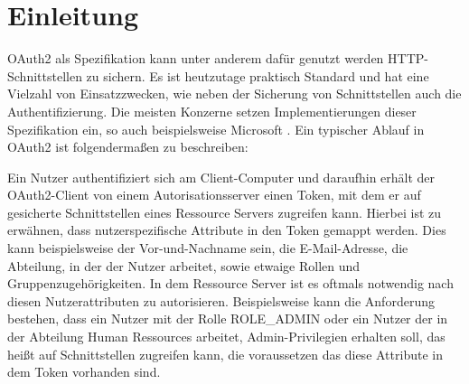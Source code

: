 \chapter{Einleitung}
\label{ch:intro}
OAuth2 als Spezifikation kann unter anderem dafür genutzt werden \ac{HTTP}-Schnittstellen zu sichern. Es ist heutzutage praktisch Standard und hat eine Vielzahl von Einsatzzwecken, wie neben der Sicherung von Schnittstellen auch die Authentifizierung. Die meisten Konzerne setzen Implementierungen dieser Spezifikation ein, so auch beispielsweise Microsoft \citep{microsoftoauth2:2021:07}. Ein typischer Ablauf in OAuth2 ist folgendermaßen zu beschreiben:\smallskip

Ein Nutzer authentifiziert sich am Client-Computer und daraufhin erhält der OAuth2-Client von einem Autorisationsserver einen Token, mit dem er auf gesicherte Schnittstellen eines Ressource Servers zugreifen kann. Hierbei ist zu erwähnen, dass nutzerspezifische Attribute in den Token gemappt werden. Dies kann beispielsweise der Vor-und-Nachname sein, die E-Mail-Adresse, die Abteilung, in der der Nutzer arbeitet, sowie etwaige Rollen und Gruppenzugehörigkeiten. In dem Ressource Server ist es oftmals notwendig nach diesen Nutzerattributen zu autorisieren. Beispielsweise kann die Anforderung bestehen, dass ein Nutzer mit der Rolle ROLE\_ADMIN oder ein Nutzer der in der Abteilung Human Ressources arbeitet, Admin-Privilegien erhalten soll, das heißt auf Schnittstellen zugreifen kann, die voraussetzen das diese Attribute in dem Token vorhanden sind.\smallskip

